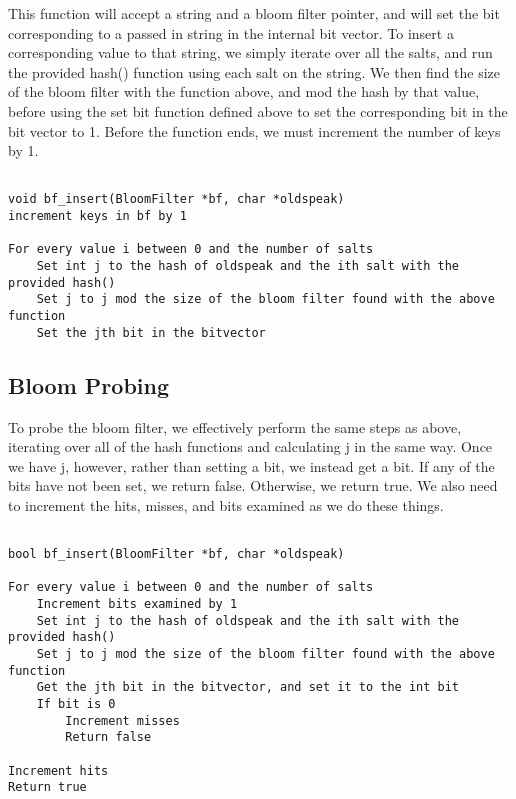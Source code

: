 \documentclass[11pt]{article}
\begin{document}
This function will accept a string and a bloom filter pointer, and will set the bit corresponding to a passed in string in the internal bit vector. To insert a corresponding value to that string, we simply iterate over all the salts, and run the provided hash() function using each salt on the string. We then find the size of the bloom filter with the function above, and mod the hash by that value, before using the set bit function defined above to set the corresponding bit in the bit vector to 1. Before the function ends, we must increment the number of keys by 1.

\begin{verbatim}

void bf_insert(BloomFilter *bf, char *oldspeak)
increment keys in bf by 1

For every value i between 0 and the number of salts
    Set int j to the hash of oldspeak and the ith salt with the provided hash()
    Set j to j mod the size of the bloom filter found with the above function
    Set the jth bit in the bitvector

\end{verbatim}

\subsection{Bloom Probing}

To probe the bloom filter, we effectively perform the same steps as above, iterating over all of the hash functions and calculating j in the same way. Once we have j, however, rather than setting a bit, we instead get a bit. If any of the bits have not been set, we return false. Otherwise, we return true. We also need to increment the hits, misses, and bits examined as we do these things.

\begin{verbatim}

bool bf_insert(BloomFilter *bf, char *oldspeak)

For every value i between 0 and the number of salts
    Increment bits examined by 1
    Set int j to the hash of oldspeak and the ith salt with the provided hash()
    Set j to j mod the size of the bloom filter found with the above function
    Get the jth bit in the bitvector, and set it to the int bit
    If bit is 0
        Increment misses
        Return false

Increment hits
Return true

\end{verbatim}
\end{document}
